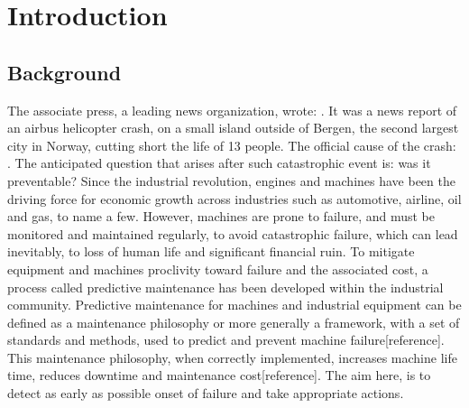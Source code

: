 \documentclass[../Main/thesis.tex]{subfiles}
\begin{document}
\chapter{Introduction}
\label{ch:introduction}

\section{Background}
\label{sec:background}
The associate press, a leading news organization, wrote: .
It was a news report of an airbus helicopter crash, on a small island outside of Bergen, the second largest city in Norway, cutting short the life of 13 people. The official cause of the crash: . The anticipated question that arises after such catastrophic event is: was it preventable?
\justify
Since the industrial revolution, engines and machines have been the driving force for economic growth across industries such as automotive, airline, oil and gas, to name a few. However, machines are prone to failure, and must be monitored and maintained regularly, to avoid catastrophic failure, which can lead inevitably, to loss of human life and significant financial ruin. 
\justify
To mitigate equipment and machines proclivity toward failure and the associated cost, a process called predictive maintenance has been developed within the industrial community. Predictive maintenance  for machines and industrial equipment can be defined as a maintenance philosophy or more generally a framework, with a set of standards and methods, used to predict and prevent machine failure[reference]. This maintenance philosophy, when correctly implemented, increases machine life time, reduces downtime and maintenance cost[reference]. The aim here, is to detect as early as possible onset of failure and take appropriate actions.
\end{document}
